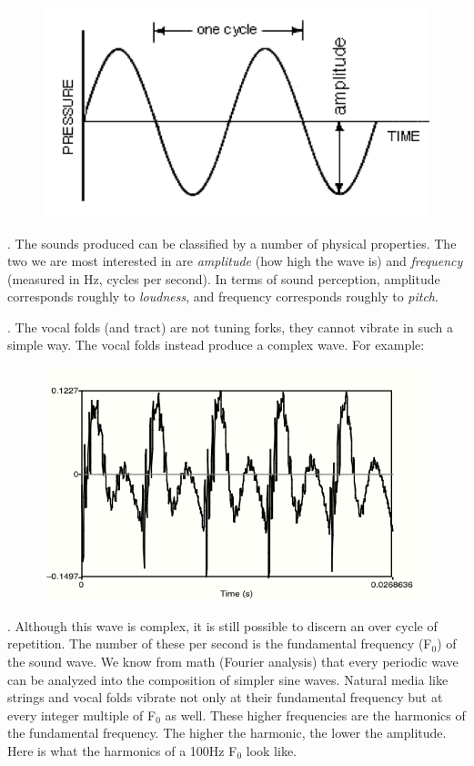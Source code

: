 \documentclass[11pt, oneside]{article}   	%
\begin{document}
\begin{figure}[h!]
\centering
\includegraphics{waves}
\end{figure}

\ex. The sounds produced can be classified by a number of physical properties.  The two we are most interested in are {\itshape amplitude} (how high the wave is) and {\itshape frequency} (measured in Hz, cycles per second). In terms of sound perception, amplitude corresponds roughly to {\itshape loudness}, and frequency corresponds roughly to {\itshape pitch}.

\ex. The vocal folds (and tract) are not tuning forks, they cannot vibrate in such a simple way. The vocal folds instead produce a complex wave.  For example:

\begin{figure}[h!]
\centering
\includegraphics{forks}
\end{figure}

\ex. Although this wave is complex, it is still possible to discern an over cycle of repetition.  The number of these per second is the fundamental frequency (F$_{0}$) of the sound wave. We know from math (Fourier analysis) that every periodic wave can be analyzed into the composition of simpler sine waves. Natural media like strings and vocal folds vibrate not only at their fundamental frequency but at every integer multiple of F$_{0}$ as well.  These higher frequencies are the harmonics of the fundamental frequency.  The higher the harmonic, the lower the amplitude.  Here is what the harmonics of a 100Hz F$_{0}$ look like.
\end{document}
